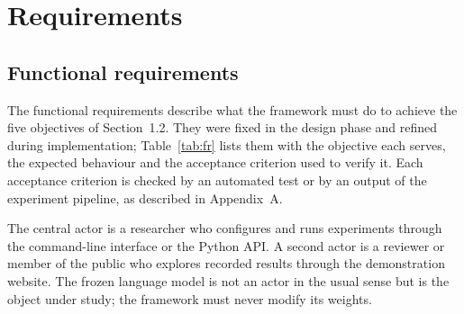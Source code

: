 \chapter{Requirements}
\section{Functional requirements}
The functional requirements describe what the framework must do to achieve the five objectives of Section~1.2. They were fixed in the design phase and refined during implementation; Table~\ref{tab:fr} lists them with the objective each serves, the expected behaviour and the acceptance criterion used to verify it. Each acceptance criterion is checked by an automated test or by an output of the experiment pipeline, as described in Appendix~A.

The central actor is a researcher who configures and runs experiments through the command-line interface or the Python API. A second actor is a reviewer or member of the public who explores recorded results through the demonstration website. The frozen language model is not an actor in the usual sense but is the object under study; the framework must never modify its weights.

